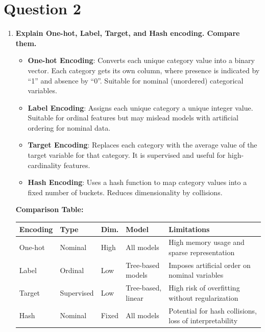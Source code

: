 \documentclass[a4paper,12pt]{article}
\begin{document}
\section*{Question 2}
\begin{enumerate}[label=(\alph*)]

\item \textbf{Explain One-hot, Label, Target, and Hash encoding. Compare them.}

\begin{itemize}
    \item \textbf{One-hot Encoding}: Converts each unique category value into a binary vector. Each category gets its own column, where presence is indicated by ``1'' and absence by ``0''. Suitable for nominal (unordered) categorical variables.
    
    \item \textbf{Label Encoding}: Assigns each unique category a unique integer value. Suitable for ordinal features but may mislead models with artificial ordering for nominal data.
    
    \item \textbf{Target Encoding}: Replaces each category with the average value of the target variable for that category. It is supervised and useful for high-cardinality features.
    
    \item \textbf{Hash Encoding}: Uses a hash function to map category values into a fixed number of buckets. Reduces dimensionality by collisions.
\end{itemize}   

\textbf{Comparison Table:}

\begin{center}
\small %
\begin{tabularx}{\textwidth}{|l|l|l|l|X|}
\hline
\textbf{Encoding} & \textbf{Type} & \textbf{Dim.} & \textbf{Model} & \textbf{Limitations} \\
\hline
One-hot & Nominal & High & All models & High memory usage and sparse representation \\
Label & Ordinal & Low & Tree-based models & Imposes artificial order on nominal variables \\
Target & Supervised & Low & Tree-based, linear & High risk of overfitting without regularization \\
Hash & Nominal & Fixed & All models & Potential for hash collisions, loss of interpretability \\
\hline
\end{tabularx}
\end{center}



\end{enumerate}
\end{document}

